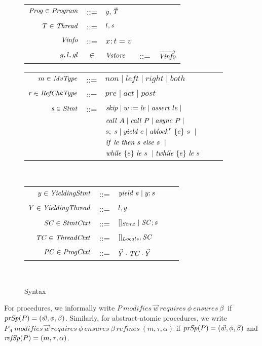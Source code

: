 \begin{figure}
\begin{tabular}{rclcl}
\end{tabular}
\begin{tabular}{rclcl}
$\Prog \in \Program$ & ::= & $\varsG, \TS$ \\
$T \in \Thread$ & ::=  & $\varsL, \stmt$ \\
$\Vinfo$ & ::= & $x:t=v$ \\
$\varsG,\varsL,\vars$ & $\in$ & $\Vstore$ & ::= & $\Vinfos$ \\
\end{tabular}
\begin{tabular}{rclcl}
$m \in \moverType$ &::= &$\mathit{non} \mid \mathit{left} \mid \mathit{right} \mid \mathit{both}$ \\
$r \in \refType$ &::= &$\mathit{pre} \mid \mathit{act} \mid \mathit{post} $ \\
$\stmt \in \Stmt$ &::= & $\skipstmt \mid w := \locExpr \mid
\assert{le} \mid $ \\
                  & & $\call{A} \mid \call{P} \mid \async{P} \mid $\\
                  & & $s;\;s \mid \yield{e} \mid \ablock{e}{s}{r} \mid$\\
                 & & $\ite{\locExpr}{s}{s} \mid$ \\
                  & & $\while{\locExpr}{e}{s} \mid \termwhile{\locExpr}{e}{s}$
                  \\ 
\end{tabular}\\
\begin{tabular}{rclcl}
$\YieldingStmt \in \mathit{YieldingStmt}$ &::= &$\yield{e} \mid \YieldingStmt;s$ \\
$\YieldingThread \in \mathit{YieldingThread}$ &::= &$\varsL, \YieldingStmt$ \\
$\StmtCtxt \in \mathit{StmtCtxt}$ &::= &$[]_{Stmt} \mid \StmtCtxt;s$ \\
$\ThreadCtxt \in \mathit{ThreadCtxt}$ &::= &$[]_{Locals}, \StmtCtxt$ \\
$\ProgCtxt \in \mathit{ProgCtxt}$ &::= &$\YieldingThreads \cdot \ThreadCtxt \cdot \YieldingThreads$ \\
\end{tabular}\\
\setlength{\tabcolsep}{6pt}
\caption{Syntax}
\label{fig:syntax}
\end{figure}

For procedures, we informally write $P\ \mathit{modifies}\
\vec{w}\ \mathit{requires}\ \phi\ \mathit{ensures}\ \beta\ $
if $\procSpecs(P) = (\vec{w}, \phi, \beta)$. Similarly, for
abstract-atomic procedures, we write $P_{A}\ \mathit{modifies}\
\vec{w}\ \mathit{requires}\ \phi\ \mathit{ensures}\ \beta\
\mathit{refines}\ (m, \tau, \alpha)$ if $\procSpecs(P) =
(\vec{w}, \phi, \beta)$ and $\procRefSpecs(P) = (m, \tau,
\alpha)$. 


